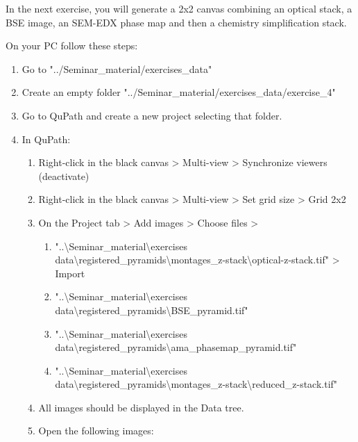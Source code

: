	In the next exercise, you will generate a 2x2 canvas combining an optical stack, a BSE image, an SEM-EDX phase map and then a chemistry simplification stack.
	
	On your PC follow these steps:
	
	\begin{enumerate}
		\def\labelenumi{\arabic{enumi}.}
		\item
		Go to "../Seminar\_material/exercises\_data"
		\item
		Create an empty folder "../Seminar\_material/exercises\_data/exercise\_4"
		\item
		Go to QuPath and create a new project selecting that folder.
		\item
		In QuPath:
		
		\begin{enumerate}
			\def\labelenumii{\alph{enumii}.}
			\item
			Right-click in the black canvas \textgreater{} Multi-view \textgreater{} Synchronize viewers (deactivate)
			\item
			Right-click in the black canvas \textgreater{} Multi-view \textgreater{} Set grid size \textgreater{} Grid 2x2
			\item
			On the Project tab \textgreater{} Add images \textgreater{} Choose files \textgreater{}
			
			\begin{enumerate}
				\def\labelenumiii{\roman{enumiii}.}
				\item
				"..\textbackslash Seminar\_material\textbackslash exercises data\textbackslash registered\_pyramids\textbackslash montages\_z-stack\textbackslash optical-z-stack.tif" \textgreater{} Import
				\item
				"..\textbackslash Seminar\_material\textbackslash exercises data\textbackslash registered\_pyramids\textbackslash BSE\_pyramid.tif"
				\item
				"..\textbackslash Seminar\_material\textbackslash exercises data\textbackslash registered\_pyramids\textbackslash ama\_phasemap\_pyramid.tif"
				\item
				"..\textbackslash Seminar\_material\textbackslash exercises data\textbackslash registered\_pyramids\textbackslash montages\_z-stack\textbackslash reduced\_z-stack.tif"
			\end{enumerate}
			\item
			All images should be displayed in the Data tree.
			\item
			Open the following images:
			

\end{enumerate}
\end{enumerate}
